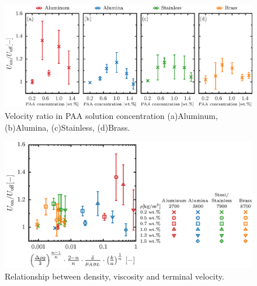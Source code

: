 \begin{figure}[ht]
    \centering
    \includegraphics[width=1.0\textwidth]{./5-Results/concentrationUdiff.eps}
    \caption{Velocity ratio in PAA solution concentration (a)Aluminum, (b)Alumina, (c)Stainless, (d)Brass.}
    \label{fig:concentrationUdiff}
\end{figure}

\begin{figure}[ht]
    \centering
    \includegraphics[width=1.0\textwidth]{./5-Results/concentrationUdiffAll.eps}
    \caption{Relationship between density, viscosity and terminal velocity.}
    \label{fig:concentrationUdiffAll}
\end{figure}